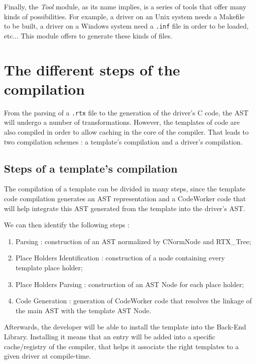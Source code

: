 \documentclass{rtxreport}
\begin{document}
Finally, the \emph{Tool} module, as its name implies, is a series of tools that
offer many kinds of possibilities. For example, a driver on an Unix system
needs a Makefile to be built, a driver on a Windows system need a \texttt{.inf}
file in order to be loaded, etc... This module offers to generate these kinds
of files.


\section{The different steps of the compilation}
\label{sec:compilationSteps}

From the parsing of a \texttt{.rtx} file to the generation of the driver's C
code, the AST will undergo a number of transformations. However, the templates
of code are also compiled in order to allow caching in the core of the compiler.
That leads to two compilation schemes : a template's compilation and a driver's
compilation.

\subsection{Steps of a template's compilation}

The compilation of a template can be divided in many steps, since the template
code compilation generates an AST representation and a CodeWorker code that
will help integrate this AST generated from the template into the driver's AST.

We can then identify the following steps :
\begin{enumerate}
    \item Parsing : construction of an AST normalized by CNormNode and
        RTX\_Tree;
    \item Place Holders Identification : construction of a node containing
        every template place holder;
    \item Place Holders Parsing : construction of an AST Node for each
        place holder;
    \item Code Generation : generation of CodeWorker code that resolves the
        linkage of the main AST with the template AST Node.
\end{enumerate}

Afterwards, the developer will be able to install the template into the Back-End
Library. Installing it means that an entry will be added into a specific
cache/registry of the compiler, that helps it associate the right templates to
a given driver at compile-time.
\end{document}
